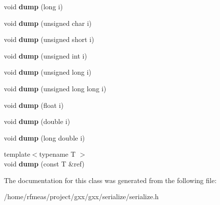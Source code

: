 \begin{DoxyCompactItemize}
\item 
void {\bfseries dump} (long i)\hypertarget{classgxx_1_1archive_1_1binary__serializer__basic_aa177f21a942782ecee23338b69ede294}{}\label{classgxx_1_1archive_1_1binary__serializer__basic_aa177f21a942782ecee23338b69ede294}

\item 
void {\bfseries dump} (unsigned char i)\hypertarget{classgxx_1_1archive_1_1binary__serializer__basic_af2472269cba3166850ba7b3009b10a89}{}\label{classgxx_1_1archive_1_1binary__serializer__basic_af2472269cba3166850ba7b3009b10a89}

\item 
void {\bfseries dump} (unsigned short i)\hypertarget{classgxx_1_1archive_1_1binary__serializer__basic_a7bf73357b5f2099d29ca8876c06384a9}{}\label{classgxx_1_1archive_1_1binary__serializer__basic_a7bf73357b5f2099d29ca8876c06384a9}

\item 
void {\bfseries dump} (unsigned int i)\hypertarget{classgxx_1_1archive_1_1binary__serializer__basic_aa3690cb7560d88fe7c41627984c0c8f7}{}\label{classgxx_1_1archive_1_1binary__serializer__basic_aa3690cb7560d88fe7c41627984c0c8f7}

\item 
void {\bfseries dump} (unsigned long i)\hypertarget{classgxx_1_1archive_1_1binary__serializer__basic_a12778c4c2fab2b46be4c2c23144dcf27}{}\label{classgxx_1_1archive_1_1binary__serializer__basic_a12778c4c2fab2b46be4c2c23144dcf27}

\item 
void {\bfseries dump} (unsigned long long i)\hypertarget{classgxx_1_1archive_1_1binary__serializer__basic_a399ba6ac58658a735209d9a1e4f53a52}{}\label{classgxx_1_1archive_1_1binary__serializer__basic_a399ba6ac58658a735209d9a1e4f53a52}

\item 
void {\bfseries dump} (float i)\hypertarget{classgxx_1_1archive_1_1binary__serializer__basic_a16af5ad71c579a5c17e9d78315f4613e}{}\label{classgxx_1_1archive_1_1binary__serializer__basic_a16af5ad71c579a5c17e9d78315f4613e}

\item 
void {\bfseries dump} (double i)\hypertarget{classgxx_1_1archive_1_1binary__serializer__basic_a03b6fe9f681d4a4370b97ee9150da506}{}\label{classgxx_1_1archive_1_1binary__serializer__basic_a03b6fe9f681d4a4370b97ee9150da506}

\item 
void {\bfseries dump} (long double i)\hypertarget{classgxx_1_1archive_1_1binary__serializer__basic_a322a38bbac67825232b635474d9167d6}{}\label{classgxx_1_1archive_1_1binary__serializer__basic_a322a38bbac67825232b635474d9167d6}

\item 
{\footnotesize template$<$typename T $>$ }\\void {\bfseries dump} (const T \&ref)\hypertarget{classgxx_1_1archive_1_1binary__serializer__basic_ae7baa8542e7e32ddd0bf25ec845c031a}{}\label{classgxx_1_1archive_1_1binary__serializer__basic_ae7baa8542e7e32ddd0bf25ec845c031a}

\end{DoxyCompactItemize}


The documentation for this class was generated from the following file\+:\begin{DoxyCompactItemize}
\item 
/home/rfmeas/project/gxx/gxx/serialize/serialize.\+h\end{DoxyCompactItemize}
